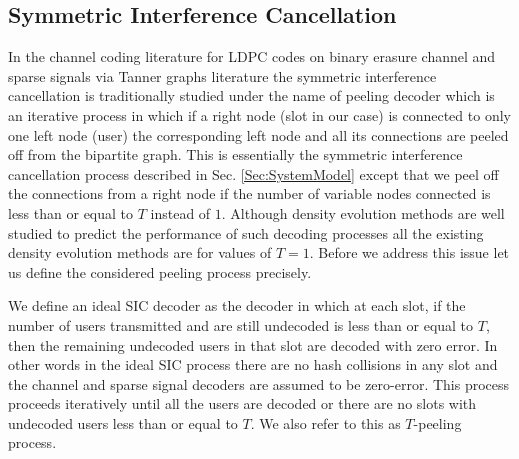 \documentclass[final,onecolumn,12pt]{IEEEtran}
\begin{document}
\subsection{Symmetric Interference Cancellation}
\label{sec:SICanalysis}
In the channel coding literature for LDPC codes on binary erasure channel and sparse signals via Tanner graphs literature the symmetric interference cancellation is traditionally studied under the name of peeling decoder which is an iterative process in which if a right node (slot in our case) is connected to only one left node (user) the corresponding left node and all its connections are peeled off from the bipartite graph. This is essentially the symmetric interference cancellation process described in Sec. \ref{Sec:SystemModel} except that we peel off the connections from a right node if the number of variable nodes connected is less than or equal to $T$ instead of $1$. Although density evolution methods are well studied to predict the performance of such decoding processes all the existing density evolution methods are for values of $T=1$. Before we address this issue let us define the considered peeling process precisely.
\begin{definition}[$T$-peeling]
\label{def:T-peeling_process}
We define an ideal SIC decoder as the decoder in which at each slot, if the number of users transmitted and are still undecoded is less than or equal to $T$, then the remaining undecoded users in that slot are decoded with zero error. In other words in the ideal SIC process there are no hash collisions in any slot and the channel and sparse signal decoders are assumed to be zero-error. This process proceeds iteratively until all the users are decoded or there are no slots with undecoded users less than or equal to $T$. We also refer to this as $T$-peeling process.
\end{definition}
\end{document}
